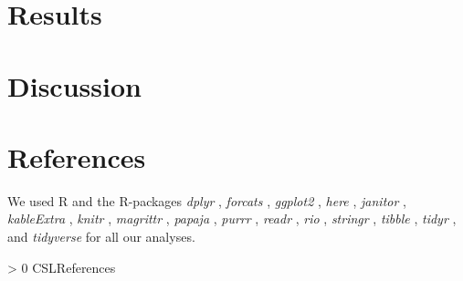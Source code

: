 \documentclass[
  english,
  man]{apa6}
\newlength{\cslhangindent}
\newenvironment{CSLReferences}[3] %
 {%
  \setlength{\parindent}{0pt}
  \ifodd #1 \everypar{\setlength{\hangindent}{\cslhangindent}}\ignorespaces\fi
  \ifnum #2 > 0
  \setlength{\parskip}{#2\baselineskip}
  \fi
 }%
 {}
\begin{document}
\hypertarget{results}{%
\section{Results}\label{results}}

\hypertarget{discussion}{%
\section{Discussion}\label{discussion}}

\newpage

\hypertarget{references}{%
\section{References}\label{references}}

We used R \autocite[Version 3.6.1;][]{R-base} and the R-packages \emph{dplyr} \autocite[Version 1.0.0;][]{R-dplyr}, \emph{forcats} \autocite[Version 0.5.0;][]{R-forcats}, \emph{ggplot2} \autocite[Version 3.3.2;][]{R-ggplot2}, \emph{here} \autocite[Version 0.1;][]{R-here}, \emph{janitor} \autocite[Version 2.0.1;][]{R-janitor}, \emph{kableExtra} \autocite[Version 1.3.1;][]{R-kableExtra}, \emph{knitr} \autocite[Version 1.29;][]{R-knitr}, \emph{magrittr} \autocite[Version 1.5;][]{R-magrittr}, \emph{papaja} \autocite[Version 0.1.0.9997;][]{R-papaja}, \emph{purrr} \autocite[Version 0.3.4;][]{R-purrr}, \emph{readr} \autocite[Version 1.3.1;][]{R-readr}, \emph{rio} \autocite[Version 0.5.16;][]{R-rio}, \emph{stringr} \autocite[Version 1.4.0;][]{R-stringr}, \emph{tibble} \autocite[Version 3.0.2;][]{R-tibble}, \emph{tidyr} \autocite[Version 1.1.0;][]{R-tidyr}, and \emph{tidyverse} \autocite[Version 1.3.0;][]{R-tidyverse} for all our analyses.

\begingroup
\setlength{\parindent}{-0.5in}
\setlength{\leftskip}{0.5in}

\hypertarget{refs}{}
\begin{CSLReferences}{0}{0}
\end{CSLReferences}

\endgroup


\printbibliography
\end{document}
